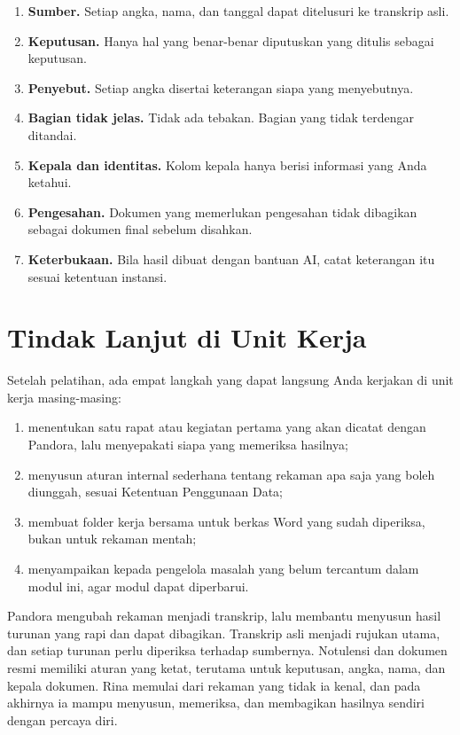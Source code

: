 \begin{enumerate}
  \item \textbf{Sumber.} Setiap angka, nama, dan tanggal dapat ditelusuri ke transkrip asli.
  \item \textbf{Keputusan.} Hanya hal yang benar-benar diputuskan yang ditulis sebagai keputusan.
  \item \textbf{Penyebut.} Setiap angka disertai keterangan siapa yang menyebutnya.
  \item \textbf{Bagian tidak jelas.} Tidak ada tebakan. Bagian yang tidak terdengar ditandai.
  \item \textbf{Kepala dan identitas.} Kolom kepala hanya berisi informasi yang Anda ketahui.
  \item \textbf{Pengesahan.} Dokumen yang memerlukan pengesahan tidak dibagikan sebagai dokumen final sebelum disahkan.
  \item \textbf{Keterbukaan.} Bila hasil dibuat dengan bantuan AI, catat keterangan itu sesuai ketentuan instansi.
\end{enumerate}

\section{Tindak Lanjut di Unit Kerja}
Setelah pelatihan, ada empat langkah yang dapat langsung Anda kerjakan di unit kerja masing-masing:
\begin{enumerate}
  \item menentukan satu rapat atau kegiatan pertama yang akan dicatat dengan Pandora, lalu menyepakati siapa yang memeriksa hasilnya;
  \item menyusun aturan internal sederhana tentang rekaman apa saja yang boleh diunggah, sesuai Ketentuan Penggunaan Data;
  \item membuat folder kerja bersama untuk berkas Word yang sudah diperiksa, bukan untuk rekaman mentah;
  \item menyampaikan kepada pengelola masalah yang belum tercantum dalam modul ini, agar modul dapat diperbarui.
\end{enumerate}

\begin{rangkuman}
Pandora mengubah rekaman menjadi transkrip, lalu membantu menyusun hasil turunan yang rapi dan dapat dibagikan. Transkrip asli menjadi rujukan utama, dan setiap turunan perlu diperiksa terhadap sumbernya. Notulensi dan dokumen resmi memiliki aturan yang ketat, terutama untuk keputusan, angka, nama, dan kepala dokumen. Rina memulai dari rekaman yang tidak ia kenal, dan pada akhirnya ia mampu menyusun, memeriksa, dan membagikan hasilnya sendiri dengan percaya diri.
\end{rangkuman}
